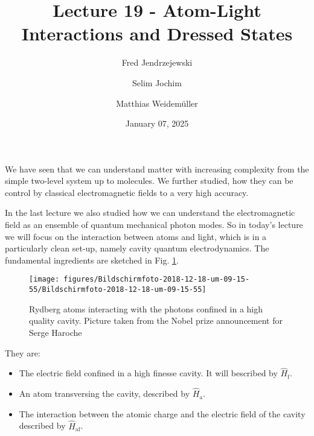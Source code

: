 \documentclass[10pt]{article}
\let\cite\citep
\providecommand\citep{\cite}
\begin{document}
\title{Lecture 19 - Atom-Light Interactions and Dressed States}



\author[1]{Fred Jendrzejewski}%
\author[2]{Selim Jochim}%
\author[2]{Matthias Weidemüller}%
%
%


\vspace{-1em}



  
  \date{January 07, 2025}


\begingroup
\let\center\flushleft
\let\endcenter\endflushleft
\maketitle
\endgroup








\sloppy


We have seen that we can understand matter with increasing complexity from the simple two-level system up to molecules. We further studied, how they can be control by classical electromagnetic fields to a very high accuracy.

In the last lecture \cite{field} we also studied how we can understand the electromagnetic field as an ensemble of quantum mechanical photon modes. So in today's lecture we will focus on the interaction between atoms and light, which is in a particularly clean set-up, namely cavity quantum electrodynamics. The fundamental ingredients are sketched in Fig. \ref{305911}.
\begin{figure}[h!]
\begin{center}
\texttt{[image: figures/Bildschirmfoto-2018-12-18-um-09-15-55/Bildschirmfoto-2018-12-18-um-09-15-55]}
\caption{{Rydberg atoms interacting with the photons confined in a high quality
cavity. Picture taken from the Nobel prize announcement for Serge
Haroche \protect\cite{2012a}
{\label{305911}}%
}}
\end{center}
\end{figure}

They are:
\begin{itemize}
\item The electric field confined in a high finesse cavity. It will bescribed by $\hat{H}_\textrm{f}$.
\item An atom transversing the cavity, described by $\hat{H}_\textrm{a}$.
\item The interaction between the atomic charge and the electric field of the cavity described by $\hat{H}_\textrm{af}$.
\end{itemize}
\end{document}
